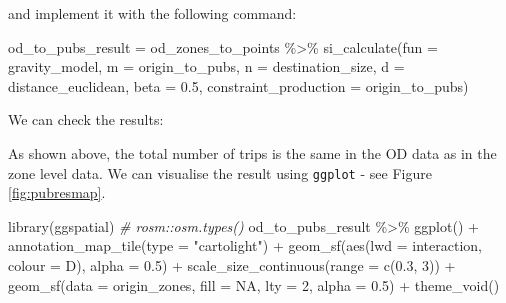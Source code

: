 \documentclass[11pt,letterpaper]{article}
\newenvironment{Shaded}{\begin{snugshade}}{\end{snugshade}}
\newcommand{\AttributeTok}[1]{\textcolor[rgb]{0.77,0.63,0.00}{#1}}
\newcommand{\CommentTok}[1]{\textcolor[rgb]{0.56,0.35,0.01}{\textit{#1}}}
\newcommand{\ConstantTok}[1]{\textcolor[rgb]{0.00,0.00,0.00}{#1}}
\newcommand{\DecValTok}[1]{\textcolor[rgb]{0.00,0.00,0.81}{#1}}
\newcommand{\FloatTok}[1]{\textcolor[rgb]{0.00,0.00,0.81}{#1}}
\newcommand{\FunctionTok}[1]{\textcolor[rgb]{0.00,0.00,0.00}{#1}}
\newcommand{\NormalTok}[1]{#1}
\newcommand{\OtherTok}[1]{\textcolor[rgb]{0.56,0.35,0.01}{#1}}
\newcommand{\SpecialCharTok}[1]{\textcolor[rgb]{0.00,0.00,0.00}{#1}}
\newcommand{\StringTok}[1]{\textcolor[rgb]{0.31,0.60,0.02}{#1}}
\begin{document}
and implement it with the following command:

\begin{Shaded}
\begin{Highlighting}[]
\NormalTok{od\_to\_pubs\_result }\OtherTok{=}\NormalTok{ od\_zones\_to\_points }\SpecialCharTok{\%\textgreater{}\%} 
  \FunctionTok{si\_calculate}\NormalTok{(}\AttributeTok{fun =}\NormalTok{ gravity\_model, }
               \AttributeTok{m =}\NormalTok{ origin\_to\_pubs,}
               \AttributeTok{n =}\NormalTok{ destination\_size,}
               \AttributeTok{d =}\NormalTok{ distance\_euclidean,}
               \AttributeTok{beta =} \FloatTok{0.5}\NormalTok{,}
               \AttributeTok{constraint\_production =}\NormalTok{ origin\_to\_pubs)}
\end{Highlighting}
\end{Shaded}

We can check the results:

\begin{Shaded}
\end{Shaded}

As shown above, the total number of trips is the same in the OD data as in the zone level data.
We can visualise the result using \texttt{ggplot} - see Figure \ref{fig:pubresmap}.

\begin{Shaded}
\begin{Highlighting}[]
\FunctionTok{library}\NormalTok{(ggspatial)}
\CommentTok{\# rosm::osm.types()}
\NormalTok{od\_to\_pubs\_result }\SpecialCharTok{\%\textgreater{}\%} 
  \FunctionTok{ggplot}\NormalTok{() }\SpecialCharTok{+}
  \FunctionTok{annotation\_map\_tile}\NormalTok{(}\AttributeTok{type =} \StringTok{"cartolight"}\NormalTok{) }\SpecialCharTok{+}
  \FunctionTok{geom\_sf}\NormalTok{(}\FunctionTok{aes}\NormalTok{(}\AttributeTok{lwd =}\NormalTok{ interaction, }\AttributeTok{colour =}\NormalTok{ D), }\AttributeTok{alpha =} \FloatTok{0.5}\NormalTok{) }\SpecialCharTok{+}
  \FunctionTok{scale\_size\_continuous}\NormalTok{(}\AttributeTok{range =} \FunctionTok{c}\NormalTok{(}\FloatTok{0.3}\NormalTok{, }\DecValTok{3}\NormalTok{)) }\SpecialCharTok{+}
  \FunctionTok{geom\_sf}\NormalTok{(}\AttributeTok{data =}\NormalTok{ origin\_zones, }\AttributeTok{fill =} \ConstantTok{NA}\NormalTok{, }\AttributeTok{lty =} \DecValTok{2}\NormalTok{, }\AttributeTok{alpha =} \FloatTok{0.5}\NormalTok{) }\SpecialCharTok{+}
  \FunctionTok{theme\_void}\NormalTok{()}
\end{Highlighting}
\end{Shaded}
\end{document}
